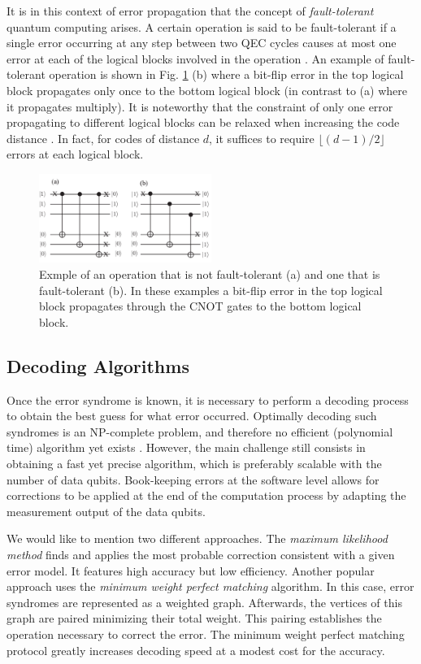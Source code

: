 It is in this context of error propagation that the concept of
\textit{fault-tolerant} quantum computing arises. A certain operation is said to
be fault-tolerant if a single error occurring at any step between two QEC cycles
causes at most one error at each of the logical blocks involved in the operation
\cite{Devitt_2013}. An example of fault-tolerant operation is shown in Fig.
\ref{fig:fault_tol} (b) where a bit-flip error in the top logical block
propagates only once to the bottom logical block (in contrast to (a) where it
propagates multiply). It is noteworthy that the constraint of only one error
propagating to different logical blocks can be relaxed when increasing the code
distance \cite{Devitt_2013}. In fact, for codes of distance $d$, it suffices to
require $\lfloor{(d-1)/2} \rfloor$ errors at each logical block.

\begin{figure}[htbp]
  \centering
  \includegraphics[width=0.5\textwidth]{images/fault_tolerance.pdf}
  \caption{Exmple of an operation that is not fault-tolerant (a) and one that is
    fault-tolerant (b). In these examples a bit-flip error in the top logical
    block propagates through the CNOT gates to the bottom logical block.}
  \label{fig:fault_tol}
\end{figure}

\subsection{Decoding Algorithms}
Once the error syndrome is known, it is necessary to perform a decoding process
to obtain the best guess for what error occurred. Optimally decoding such
syndromes is an NP-complete problem, and therefore no efficient (polynomial
time) algorithm yet exists \cite{Berlekamp}. However, the main challenge still
consists in obtaining a fast yet precise algorithm, which is preferably scalable
with the number of data qubits. Book-keeping errors at the
software level allows for corrections to be applied at the end of the
computation process by adapting the measurement output of the data qubits.

We would like to mention two different approaches. The \textit{maximum
  likelihood method} \cite{Varsamopoulos_2020} finds and applies the most
probable correction consistent with a given error model. It features high
accuracy but low efficiency. Another popular approach uses the \textit{minimum
  weight perfect matching} \cite{fowler2013minimum} algorithm. In this case,
error syndromes are represented as a weighted graph. Afterwards, the vertices of
this graph are paired minimizing their total weight. This pairing establishes
the operation necessary to correct the error. The minimum weight perfect
matching protocol greatly increases decoding speed at a modest cost for the
accuracy.

